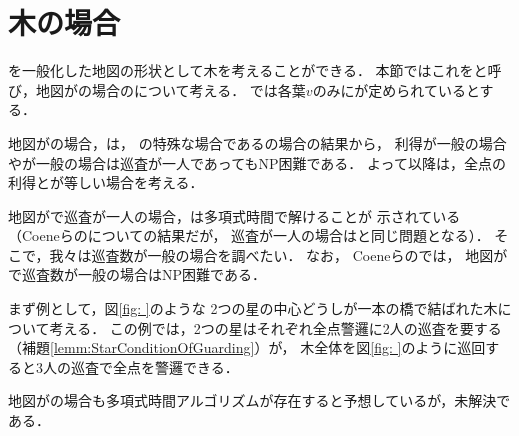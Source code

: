 \section*{木の場合}

{\graphStar}を一般化した地図の形状として木を考えることができる．
本節ではこれを{\graphTree}と呼び，地図が{\graphTree}の場合の{\patProb}について考える．
{\graphTree}では各葉$v$のみに{\maxIdletime}が定められているとする．

地図が{\graphTree}の場合，{\patProb}は，
{\graphTree}の特殊な場合である{\graphStar}の場合の結果から，
利得が一般の場合や{\maxIdletime}が一般の場合は巡査が一人であってもNP困難である．
よって以降は，全点の利得と{\maxIdletime}が等しい場合を考える．

地図が{\graphTree}で巡査が一人の場合，{\patProb}は多項式時間で解けることが
示されている
\cite[Corollary 3]{coene2011charlemagne}
（Coeneら\cite{coene2011charlemagne}の{\independentPatProb}についての結果だが，
巡査が一人の場合は{\patProb}と同じ問題となる）．
そこで，我々は巡査数が一般の場合を調べたい．
なお，
Coeneら\cite{coene2011charlemagne}の{\independentPatProb}では，
地図が{\graphTree}で巡査数が一般の場合はNP困難である．


まず例として，図\ref{fig: }のような
2つの星の中心どうしが一本の橋で結ばれた木について考える．
この例では，2つの星はそれぞれ全点警邏に2人の巡査を要する
（補題\ref{lemm:StarConditionOfGuarding}）が，
木全体を図\ref{fig: }のように巡回すると3人の巡査で全点を警邏できる．





地図が{\graphTree}の場合も多項式時間アルゴリズムが存在すると予想しているが，未解決である．
